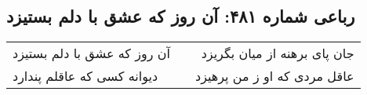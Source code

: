 \begin{center}
\section*{رباعی شماره ۴۸۱: آن روز که عشق با دلم بستیزد}
\label{sec:0481}
\begin{longtable}{l p{0.5cm} r}
آن روز که عشق با دلم بستیزد
&&
جان پای برهنه از میان بگریزد
\\
دیوانه کسی که عاقلم پندارد
&&
عاقل مردی که او ز من پرهیزد
\\
\end{longtable}
\end{center}
